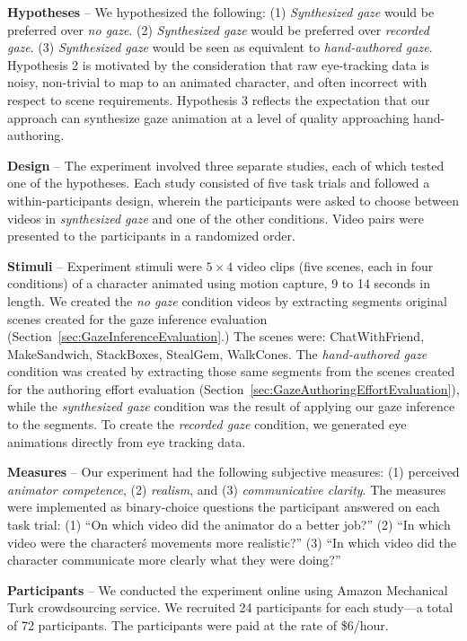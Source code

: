 \noindent\textbf{Hypotheses} -- We hypothesized the following: (1) \emph{Synthesized gaze} would be preferred over \emph{no gaze}. (2) \emph{Synthesized gaze} would be preferred over \emph{recorded gaze}. (3) \emph{Synthesized gaze} would be seen as equivalent to \emph{hand-authored gaze}. Hypothesis 2 is motivated by the consideration that raw eye-tracking data is noisy, non-trivial to map to an animated character, and often incorrect with respect to scene requirements. Hypothesis 3 reflects the expectation that our approach can synthesize gaze animation at a level of quality approaching hand-authoring.

\noindent\textbf{Design} -- The experiment involved three separate studies, each of which tested one of the hypotheses. Each study consisted of five task trials and followed a within-participants design, wherein the participants were asked to choose between videos in \emph{synthesized gaze} and one of the other conditions. Video pairs were presented to the participants in a randomized order.

\noindent\textbf{Stimuli} -- Experiment stimuli were $5 \times 4$ video clips (five scenes, each in four conditions) of a character animated using motion capture, 9 to 14 seconds in length. We created the \emph{no gaze} condition videos by extracting segments original scenes created for the gaze inference evaluation (Section~\ref{sec:GazeInferenceEvaluation}.) The scenes were: ChatWithFriend, MakeSandwich, StackBoxes, StealGem, WalkCones. The \emph{hand-authored gaze} condition was created by extracting those same segments from the scenes created for the authoring effort evaluation (Section~\ref{sec:GazeAuthoringEffortEvaluation}), while the \emph{synthesized gaze} condition was the result of applying our gaze inference to the segments. To create the \emph{recorded gaze} condition, we generated eye animations directly from eye tracking data.

\noindent\textbf{Measures} -- Our experiment had the following subjective measures: (1) perceived \emph{animator competence}, (2) \emph{realism}, and (3) \emph{communicative clarity}. The measures were implemented as binary-choice questions the participant answered on each task trial: (1) ``On which video did the animator do a better job?'' (2) ``In which video were the character\'s movements more realistic?'' (3) ``In which video did the character communicate more clearly what they were doing?''

\noindent\textbf{Participants} -- We conducted the experiment online using Amazon Mechanical Turk crowdsourcing service. We recruited 24 participants for each study---a total of 72 participants. The participants were paid at the rate of \$6/hour.

